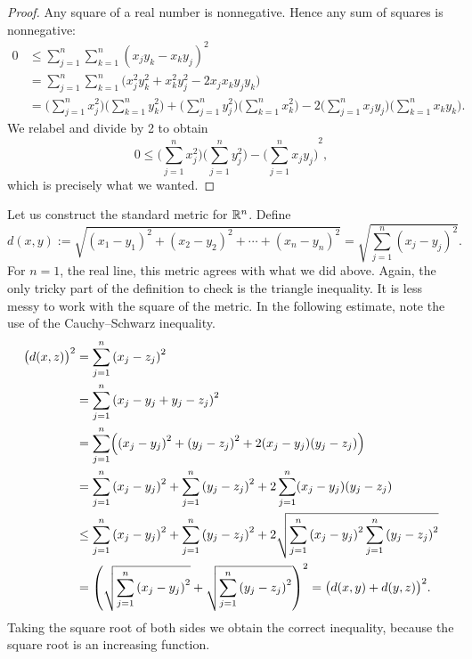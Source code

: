 \begin{proof}
Any square of a real number is nonnegative.  Hence any sum of squares is
nonnegative:
\begin{equation*}
\begin{split}
0 & \leq 
\sum_{j=1}^n \sum_{k=1}^n {(x_j y_k - x_k y_j)}^2
\\
& =
\sum_{j=1}^n \sum_{k=1}^n \bigl( x_j^2 y_k^2 + x_k^2 y_j^2 - 2 x_j x_k y_j
y_k \bigr)
\\
& =
\biggl( \sum_{j=1}^n x_j^2 \biggr)
\biggl( \sum_{k=1}^n y_k^2 \biggr)
+
\biggl( \sum_{j=1}^n y_j^2 \biggr)
\biggl( \sum_{k=1}^n x_k^2 \biggr)
-
2
\biggl( \sum_{j=1}^n x_j y_j \biggr)
\biggl( \sum_{k=1}^n x_k y_k \biggr) .
\end{split}
\end{equation*}
We relabel and divide by 2 to obtain
\begin{equation*}
0 \leq 
\biggl( \sum_{j=1}^n x_j^2 \biggr)
\biggl( \sum_{j=1}^n y_j^2 \biggr)
-
{\biggl( \sum_{j=1}^n x_j y_j \biggr)}^2 ,
\end{equation*}
which is precisely what we wanted.
\end{proof}

\begin{example}
Let us construct the
standard metric for ${\mathbb{R}}^n$.  Define
\begin{equation*}
d(x,y) :=
\sqrt{
{(x_1-y_1)}^2 + 
{(x_2-y_2)}^2 + 
\cdots +
{(x_n-y_n)}^2
} =
\sqrt{
\sum_{j=1}^n
{(x_j-y_j)}^2 
} .
\end{equation*}
For $n=1$, the real line, this metric agrees with what we did above.  Again,
the only tricky part of the definition to check is the triangle inequality.
It is less messy to work with the square of the metric.  In the
following estimate, note the use of the Cauchy--Schwarz inequality.
\begin{equation*}
\begin{split}
{\bigl(d(x,z)\bigr)}^2 & =
\sum_{j=1}^n
{(x_j-z_j)}^2 
\\
& =
\sum_{j=1}^n
{(x_j-y_j+y_j-z_j)}^2 
\\
& =
\sum_{j=1}^n
\Bigl(
{(x_j-y_j)}^2+{(y_j-z_j)}^2 + 2(x_j-y_j)(y_j-z_j)
\Bigr)
\\
& =
\sum_{j=1}^n
{(x_j-y_j)}^2
+
\sum_{j=1}^n
{(y_j-z_j)}^2 
+
2
\sum_{j=1}^n
(x_j-y_j)(y_j-z_j)
\\
& \leq
\sum_{j=1}^n
{(x_j-y_j)}^2
+
\sum_{j=1}^n
{(y_j-z_j)}^2 
+
2
\sqrt{
\sum_{j=1}^n
{(x_j-y_j)}^2
\sum_{j=1}^n
{(y_j-z_j)}^2
}
\\
& =
{\left(
\sqrt{
\sum_{j=1}^n
{(x_j-y_j)}^2
}
+
\sqrt{
\sum_{j=1}^n
{(y_j-z_j)}^2 
}
\right)}^2
=
{\bigl( d(x,y) + d(y,z) \bigr)}^2 .
\end{split}
\end{equation*}
Taking the square root of both sides we obtain the correct inequality,
because the square root is an increasing function.
\end{example}


